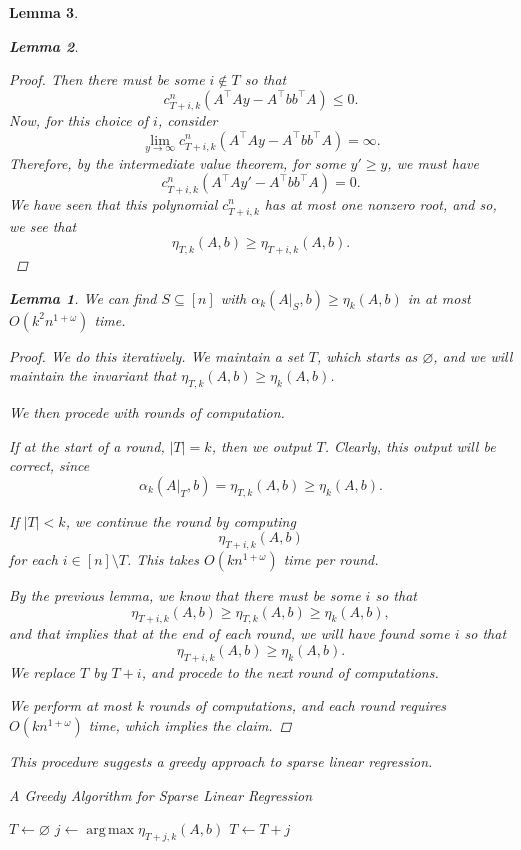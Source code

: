 \documentclass[a4paper]{article}
\newtheorem{lemma}{Lemma}
\DeclareMathOperator*{\argmax}{arg\,max}
\begin{document}
\begin{lemma}
\begin{lemma}
\begin{proof}
    Then there must be some $i \not \in T$ so that 
    \[
        c_{T+i,k}^n(A^{\intercal}A y - A^{\intercal}bb^{\intercal}A) \le 0.
    \]
    Now, for this choice of $i$, consider
    \[
        \lim_{y \rightarrow \infty} c_{T+i,k}^n(A^{\intercal}A y - A^{\intercal}bb^{\intercal}A) = \infty.
    \]
    Therefore, by the intermediate value theorem, for some $y' \ge y$, we must have
    \[
        c_{T+i,k}^n(A^{\intercal}A y' - A^{\intercal}bb^{\intercal}A) = 0.
    \]
    We have seen that this polynomial $c_{T+i,k}^n$ has at most one nonzero root, and so, we see that 
    \[
        \eta_{T, k}(A,b) \ge \eta_{T+i, k}(A,b).
    \]
\end{proof}
\begin{lemma}
    We can find $S \subseteq [n]$ with $\alpha_k(A|_S, b) \ge \eta_k(A, b)$ in at most $O(k^2n^{1+\omega})$ time.
\end{lemma}
\begin{proof}
    We do this iteratively. We maintain a set $T$, which starts as $\varnothing$, and we will maintain the invariant that $\eta_{T, k}(A, b) \ge \eta_k(A,b)$.

    We then procede with rounds of computation.

    If at the start of a round, $|T| = k$, then we output $T$. Clearly, this output will be correct, since
    \[
        \alpha_k(A|_T, b) = \eta_{T, k}(A,b) \ge \eta_k(A,b).
    \]


    If $|T| < k$, we continue the round by computing
    \[
        \eta_{T+i, k}(A,b)
    \]
    for each $i \in [n] \setminus T$. This takes $O(kn^{1+\omega})$ time per round.

    By the previous lemma, we know that there must be some $i$ so that
    \[
        \eta_{T+i, k}(A,b) \ge \eta_{T,k}(A,b) \ge \eta_k(A,b),
    \]
    and that implies that at the end of each round, we will have found some $i$ so that 
    \[
        \eta_{T+i, k}(A,b) \ge \eta_k(A,b).
    \]
    We replace $T$ by $T+i$, and procede to the next round of computations.

    We perform at most $k$ rounds of computations, and each round requires $O(kn^{1+\omega})$ time, which implies the claim.
\end{proof}


This procedure suggests a greedy approach to sparse linear regression.
\begin{algorithm}
    \caption{A Greedy Algorithm for Sparse Linear Regression}
    \begin{algorithmic}\label{alg:greedy}
        \State $T \gets \varnothing$
            \State $j \gets \argmax \eta_{T+j, k}(A,b)$
            \State $T \gets T + j$
        \EndFor


\end{algorithmic}
\end{algorithm}
\end{lemma}
\end{lemma}
\end{document}
